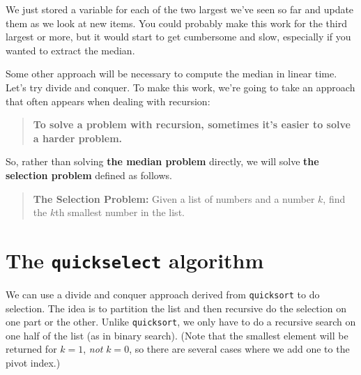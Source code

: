 We just stored a variable for each of the two largest we've seen so far and update them as we look at new items.
You could probably make this work for the third largest or more, but it would start to get cumbersome and slow, especially if you wanted to extract the median.


Some other approach will be necessary to compute the median in linear time.
Let's try divide and conquer.
To make this work, we're going to take an approach that often appears when dealing with recursion:

\begin{quote}

\textbf{To solve a problem with recursion, sometimes it's easier to solve a harder problem.}

\end{quote}

So, rather than solving \textbf{the median problem} directly, we will solve \textbf{the selection problem} defined as follows.

\begin{quote}

\textbf{The Selection Problem:} Given a list of numbers and a number $k$, find the $k$th smallest number in the list.

\end{quote}
\section{The \texttt{quickselect} algorithm}


We can use a divide and conquer approach derived from \texttt{quicksort} to do selection.
The idea is to partition the list and then recursive do the selection on one part or the other.
Unlike \texttt{quicksort}, we only have to do a recursive search on one half of the list (as in binary search).
(Note that the smallest element will be returned for $k=1$, \emph{not} $k=0$, so there are several cases where we add one to the pivot index.)


